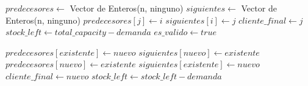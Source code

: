 \begin{algorithm}[H]
	\caption{\Comment $\mathcal{O}(n)$}
	\begin{algorithmic}[1]\label{nuevo-truck}
		\State $predecesores \gets$ Vector de Enteros(n, ninguno)
		\State $siguientes \gets$ Vector de Enteros(n, ninguno)
		\State $predecesores[j] \gets i$
		\State $siguientes[i] \gets j$
		\State $cliente\_final \gets j$	
		\State $stock\_left \gets total\_capacity - demanda$ 
		\State $es\_valido \gets  true$ 
		\EndFunction
	\end{algorithmic}
\end{algorithm}

\begin{algorithm}[H]
	\caption{\Comment $\mathcal{O}(1)$}
	\begin{algorithmic}[1]\label{visitar-nodo}
		\State $predecesores[existente] \gets nuevo$
		\State $siguientes[nuevo] \gets existente$
		\Else 
		\State $predecesores[nuevo] \gets existente$
		\State $siguientes[existente] \gets nuevo$
		\State $cliente\_final \gets nuevo$
		\EndIf
		\State $stock\_left \gets stock\_left-demanda$
		\EndFunction
	\end{algorithmic}
\end{algorithm}

